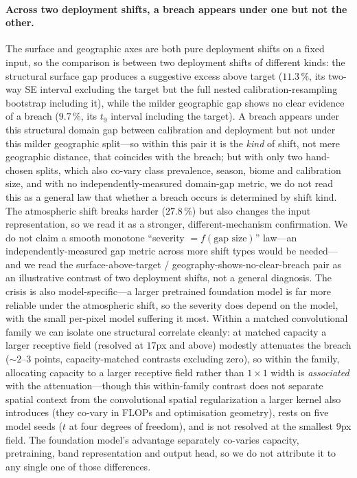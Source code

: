 \documentclass[preprint,3p,times]{elsarticle}
\begin{document}
\paragraph{Across two deployment shifts, a breach appears under one but not the other.} The surface and geographic axes are both pure deployment shifts on a fixed input, so the comparison is between two deployment shifts of different kinds: the structural surface gap produces a suggestive excess above target ($11.3\,\%$, its two-way SE interval excluding the target but the full nested calibration-resampling bootstrap including it), while the milder geographic gap shows no clear evidence of a breach ($9.7\,\%$, its $t_9$ interval including the target). A breach appears under this structural domain gap between calibration and deployment but not under this milder geographic split---so within this pair it is the \emph{kind} of shift, not mere geographic distance, that coincides with the breach; but with only two hand-chosen splits, which also co-vary class prevalence, season, biome and calibration size, and with no independently-measured domain-gap metric, we do not read this as a general law that whether a breach occurs is determined by shift kind. The atmospheric shift breaks harder ($27.8\,\%$) but also changes the input representation, so we read it as a stronger, different-mechanism confirmation. We do not claim a smooth monotone ``severity $= f(\text{gap size})$'' law---an independently-measured gap metric across more shift types would be needed---and we read the surface-above-target / geography-shows-no-clear-breach pair as an illustrative contrast of two deployment shifts, not a general diagnosis. The crisis is also model-specific---a larger pretrained foundation model is far more reliable under the atmospheric shift, so the severity does depend on the model, with the small per-pixel model suffering it most. Within a matched convolutional family we can isolate one structural correlate cleanly: at matched capacity a larger receptive field (resolved at $17$px and above) modestly attenuates the breach (${\sim}2$--$3$ points, capacity-matched contrasts excluding zero), so within the family, allocating capacity to a larger receptive field rather than $1\times1$ width is \emph{associated} with the attenuation---though this within-family contrast does not separate spatial context from the convolutional spatial regularization a larger kernel also introduces (they co-vary in FLOPs and optimisation geometry), rests on five model seeds ($t$ at four degrees of freedom), and is not resolved at the smallest $9$px field. The foundation model's advantage separately co-varies capacity, pretraining, band representation and output head, so we do not attribute it to any single one of those differences.
\end{document}
